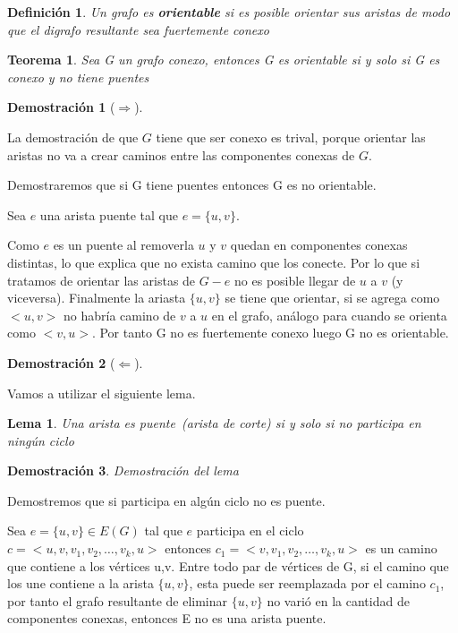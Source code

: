 \documentclass[a4paper,1pt]{report}
\newtheorem*{teo}{Teorema}
\newtheorem*{dem}{Demostración}
\newtheorem*{dfn}{Definición}
\newtheorem*{lem}{Lema}
\begin{document}
\begin{dfn}
 Un grafo es \textbf{orientable} si es posible orientar sus aristas de modo que el digrafo resultante sea fuertemente conexo
\end{dfn}

\begin{teo}
 Sea G un grafo conexo, entonces G es orientable si y solo si G es conexo y no tiene puentes 
\end{teo}

\begin{dem}[$\Rightarrow$]
 
\end{dem}
La demostraci\'on de que $G$ tiene que ser conexo es trival, porque orientar las aristas no va a crear caminos entre las componentes conexas de $G$.

Demostraremos que si G tiene puentes entonces G es no orientable.

Sea $e$ una arista puente tal que $e=\{u,v\}$.

Como $e$ es un puente al removerla $u$ y $v$ quedan en componentes conexas distintas, lo que explica que no exista camino que los conecte. Por lo que si tratamos de orientar 
las aristas de $G-e$ no es posible llegar de $u$ a $v$ (y viceversa). Finalmente la ariasta $\{u,v\}$ se tiene que orientar, si se agrega como $<u,v>$ no habr\'ia camino de $v$ a $u$ en el grafo, an\'alogo para cuando se orienta como $<v,u>$. 
Por tanto  G no es fuertemente conexo luego G no es orientable. \\

\begin{dem}[$\Leftarrow$]
 
\end{dem}

Vamos a utilizar el siguiente lema.

\begin{lem}
 Una arista es puente~(arista de corte) si y solo si no participa en ningún ciclo
\end{lem}

\begin{dem}
Demostración del lema 
\end{dem}


Demostremos que si participa en algún ciclo no es puente.

Sea $e=\{u,v\}\in E(G)$ tal que $e$ participa en el ciclo $c=<u,v,v_1,v_2,\dots,v_k,u>$ entonces $c_1=<v,v_1,v_2,\dots,v_k,u>$ es un camino que contiene a los vértices u,v.
Entre todo par de vértices de G, si el camino que los une contiene a la arista $\{u,v\}$, esta puede ser reemplazada por el camino $c_1$, por tanto el grafo resultante de eliminar $\{u,v\}$ no varió en la cantidad de componentes conexas, entonces  E no es una arista puente.\\
\end{document}

